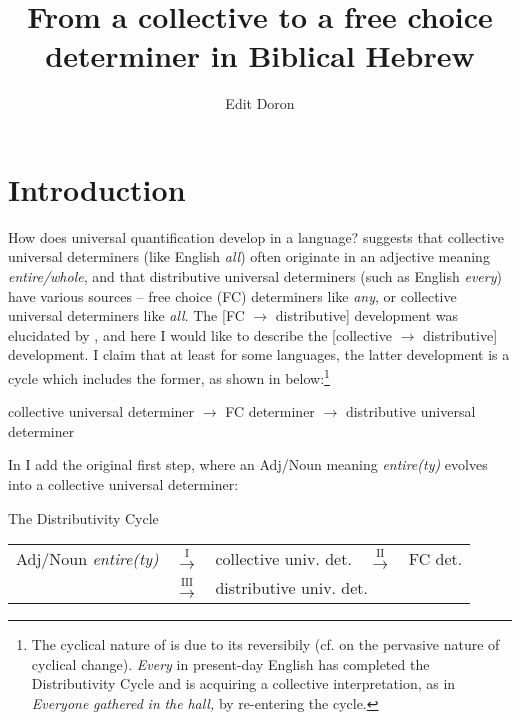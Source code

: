 \documentclass[output=paper]{langsci/langscibook}
\title{From a collective to a free choice determiner in Biblical Hebrew}
\author{Edit Doron\affiliation{Hebrew University of Jerusalem}}
\begin{document}
\maketitle

\section{Introduction}%
\largerpage
How does universal quantification develop in a language? \citet{Haspelmath1995}  suggests that collective universal determiners (like English \textit{all}) often originate in an adjective meaning \textit{entire/whole}, and that distributive universal determiners (such as English \textit{every}) have various sources – free choice (FC) determiners like \textit{any}, or collective universal determiners like \textit{all}. The [FC ${\rightarrow}$ distributive] development was elucidated by \citet{Beck2017}, and here I would like to describe the [collective ${\rightarrow}$ distributive] development. I claim that at least for some languages, the latter development is a cycle which includes the former, as shown in  below:{\footnote{\textrm{The cyclical nature of  is due to its reversibily} (cf. \citealt{Gelderen2011} on the pervasive nature of cyclical change). \textrm{\textit{Every}} \textrm{in present-day English} has completed the Distributivity Cycle and is acquiring a collective interpretation, as in \textit{Everyone} \textit{gathered} \textit{in} \textit{the} \textit{hall,} by re-entering the cycle.}}

\ea%
    \label{ex:doron:1}
            collective universal determiner  ${\rightarrow}$   FC determiner  ${\rightarrow}$  distributive universal determiner
\z


In  I add the original first step, where an Adj/Noun meaning \textit{entire(ty)} \linebreak evolves into a collective universal determiner:

\ea%
    The Distributivity Cycle\label{ex:doron:2}\\\relax
                   \begin{tabular}{@{}lclcl@{}}
                   Adj/Noun \textit{entire(ty)} & $\stackrel{\text{I}}{\rightarrow}$  &  collective univ. det. & $\stackrel{\text{II}}{\rightarrow}$ &  FC det.\\
                                                & $\stackrel{\text{III}}{\rightarrow}$ & \multicolumn{3}{l}{distributive univ. det.}\\
                   \end{tabular}
\z
\end{document}
